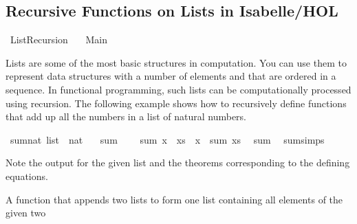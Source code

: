 %
\begin{isabellebody}%
%
%
\begin{isamarkuptext}%
\section*{Recursive Functions on Lists in Isabelle/HOL}%
\end{isamarkuptext}\isamarkuptrue%
%
\isadelimtheory
%
\endisadelimtheory
%
\isatagtheory
{}\isamarkupfalse%
\ List{\isacharunderscore}{\kern0pt}Recursion\isanewline
\ \ \ Main\isanewline
{}%
\endisatagtheory
{\isafoldtheory}%
%
\isadelimtheory
%
\endisadelimtheory
%
\begin{isamarkuptext}%
Lists are some of the most basic structures in computation. You can use them to represent data
      structures with a number of elements and that are ordered in a sequence.
      In functional programming, such lists can be computationally processed using recursion.
      The following example shows how to recursively define functions that add up all the numbers in
      a list of natural numbers.%
\end{isamarkuptext}\isamarkuptrue%
\isamarkupfalse%
\ sum{\isacharcolon}{\kern0pt}{\isacharcolon}{\kern0pt}{\isachardoublequoteopen}nat\ list\ {\isasymRightarrow}\ nat{\isachardoublequoteclose}\ \isanewline
\ \ {\isachardoublequoteopen}sum\ {\isacharbrackleft}{\kern0pt}{\isacharbrackright}{\kern0pt}\ {\isacharequal}{\kern0pt}\ {}{\isachardoublequoteclose}\isanewline
{\isacharbar}{\kern0pt}\ {\isachardoublequoteopen}sum\ {\isacharparenleft}{\kern0pt}x\ {\isacharhash}{\kern0pt}\ xs{\isacharparenright}{\kern0pt}\ {\isacharequal}{\kern0pt}\ x\ {\isacharplus}{\kern0pt}\ sum\ xs{\isachardoublequoteclose}\ \isanewline
\isanewline
{}\isamarkupfalse%
\ {\isachardoublequoteopen}sum\ {\isacharbrackleft}{\kern0pt}{}{\isacharcomma}{\kern0pt}{}{\isacharbrackright}{\kern0pt}{\isachardoublequoteclose}\isanewline
\isanewline
{}\isamarkupfalse%
\ sum{\isachardot}{\kern0pt}simps%
\begin{isamarkuptext}%
Note the output for the given list and the theorems corresponding to the defining equations.%
\end{isamarkuptext}\isamarkuptrue%
%
\begin{isamarkuptext}%
A function that appends two lists to form one list containing all elements of the given two

\end{isamarkuptext}
\end{isabellebody}
